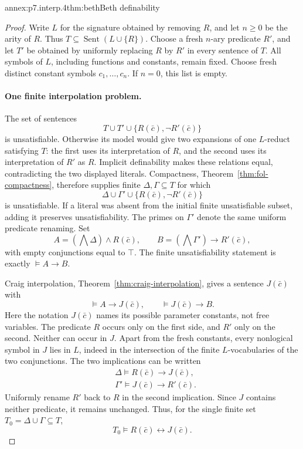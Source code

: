 \begin{annexitem}{annex:p7.interp.4}{thm:beth}{Beth definability}
\begin{proof}
Write \(L\) for the signature obtained by removing \(R\), and let
\(n\geq0\) be the arity of \(R\).
Thus \(T\subseteq\operatorname{Sent}(L\cup\{R\})\).
Choose a fresh \(n\)-ary predicate \(R'\), and let \(T'\) be obtained
by uniformly replacing \(R\) by \(R'\) in every sentence of \(T\).
All symbols of \(L\), including functions and constants, remain fixed.
Choose fresh distinct constant symbols \(c_1,\ldots,c_n\).
If \(n=0\), this list is empty.

\paragraph{One finite interpolation problem.}
The set of sentences
\[
 T\cup T'\cup\{R(\bar c),\neg R'(\bar c)\}
\]
is unsatisfiable.  Otherwise its model would give two expansions of
one \(L\)-reduct satisfying \(T\): the first uses its interpretation
of \(R\), and the second uses its interpretation of \(R'\) as \(R\).
Implicit definability makes these relations equal, contradicting the
two displayed literals.
Compactness, Theorem~\ref{thm:fol-compactness}, therefore supplies
finite \(\Delta,\Gamma\subseteq T\) for which
\[
 \Delta\cup\Gamma'\cup
       \{R(\bar c),\neg R'(\bar c)\}
\]
is unsatisfiable.  If a literal was absent from the initial finite
unsatisfiable subset, adding it preserves unsatisfiability.
The primes on \(\Gamma'\) denote the same uniform predicate renaming.
Set
\[
 A=\left(\bigwedge\Delta\right)\land R(\bar c),
 \qquad
 B=\left(\bigwedge\Gamma'\right)\to R'(\bar c),
\]
with empty conjunctions equal to \(\top\).
The finite unsatisfiability statement is exactly \(\models A\to B\).

Craig interpolation, Theorem~\ref{thm:craig-interpolation}, gives a
sentence \(J(\bar c)\) with
\[
 \models A\to J(\bar c),\qquad
 \models J(\bar c)\to B.
\]
Here the notation \(J(\bar c)\) names its possible parameter constants,
not free variables.
The predicate \(R\) occurs only on the first side, and \(R'\) only
on the second.  Neither can occur in \(J\).
Apart from the fresh constants, every nonlogical symbol in \(J\)
lies in \(L\), indeed in the intersection of the finite \(L\)-vocabularies
of the two conjunctions.
The two implications can be written
\[
\begin{aligned}
 &\Delta\models R(\bar c)\to J(\bar c),\\
 &\Gamma'\models J(\bar c)\to R'(\bar c).
\end{aligned}
\]
Uniformly rename \(R'\) back to \(R\) in the second implication.
Since \(J\) contains neither predicate, it remains unchanged.
Thus, for the single finite set \(T_0=\Delta\cup\Gamma\subseteq T\),
\[
 T_0\models R(\bar c)\leftrightarrow J(\bar c).
\]


\end{proof}
\end{annexitem}
